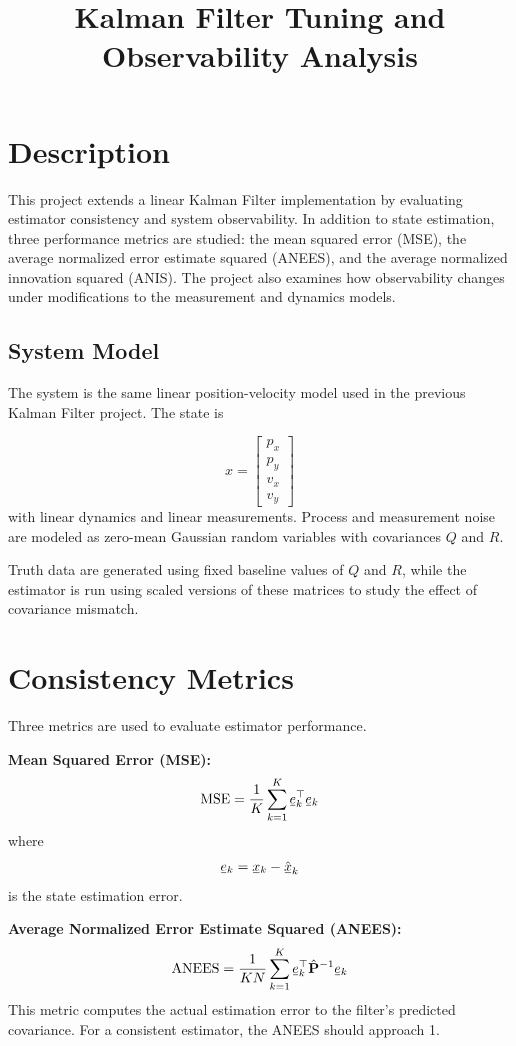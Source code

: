 \documentclass[11pt, letterpaper, twocolumn]{article}
\title{Kalman Filter Tuning and Observability Analysis}
\author{}
\date{}
\newcommand{\ul}[1] %
    {{}\mkern1mu\underline{\mkern-1mu#1\mkern-1mu}\mkern1mu}
\begin{document}
\maketitle

\section*{Description}

This project extends a linear Kalman Filter implementation by evaluating estimator
consistency and system observability. In addition to state estimation, three
performance metrics are studied: the mean squared error (MSE), the average normalized
error estimate squared (ANEES), and the average normalized innovation squared (ANIS).
The project also examines how observability changes under modifications to the 
measurement and dynamics models.

\subsection*{System Model}

The system is the same linear position-velocity model used in the previous Kalman
Filter project. The state is

\[
x = \begin{bmatrix}
    p_x \\
    p_y \\
    v_x \\
    v_y
\end{bmatrix}
\]
with linear dynamics and linear measurements. Process and measurement noise are 
modeled as zero-mean Gaussian random variables with covariances $Q$ and $R$.

Truth data are generated using fixed baseline values of $Q$ and $R$, while the
estimator is run using scaled versions of these matrices to study the effect
of covariance mismatch.

\section*{Consistency Metrics}

Three metrics are used to evaluate estimator performance.

\textbf{Mean Squared Error (MSE):}
\[
\mathrm{MSE} = \frac{1}{K} \sum_{k=1}^{K} \ul{e}_k^{\top}\ul{e}_k
\]
where
\[
\ul{e}_k = \ul{x}_k - \hat{\ul{x}}_k
\]
is the state estimation error.

\textbf{Average Normalized Error Estimate Squared (ANEES):}
\[
\mathrm{ANEES} = \frac{1}{KN} \sum_{k=1}^{K} \ul{e}_k^{\top}\hat{\mathbf{P}}^{-1}\ul{e}_k
\]
This metric computes the actual estimation error to the filter's predicted
covariance. For a consistent estimator, the ANEES should approach 1.
\end{document}
